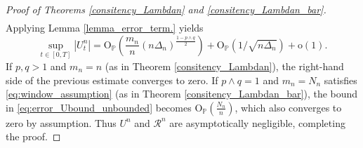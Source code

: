\documentclass[10pt,a4paper]{amsart}
\begin{document}
\begin{proof}[Proof of Theorems  \ref{consitency_Lambdan} and \ref{consitency_Lambdan_bar}]
\begin{equation}
\begin{aligned}
				\end{aligned}
				\label{eq:error_Ubound_unbounded}
			\end{equation}
			Applying Lemma \ref{lemma_error_term.} yields
			\[
			\sup_{t\in[0,T]}|U_t^n|
			=\mathrm{O}_{\mathbb{P}}(\frac{m_{n}}{n}(n\Delta_{n})^{\frac{1-p\land q}{2}})+\mathrm{O}_{\mathbb{P}}(1/\sqrt{n\Delta_{n}})+\mathrm{o}(1).
			\]
			If $p,q>1$ and $m_{n}=n$ (as in Theorem
			\ref{consitency_Lambdan}), the right-hand side of the previous estimate converges to zero. If $p\land q=1$
			and $m_{n}=N_{n}$ satisfies \eqref{eq:window_assumption} (as in Theorem \ref{consitency_Lambdan_bar}), the bound in \eqref{eq:error_Ubound_unbounded} becomes $\mathrm{O}_{\mathbb{P}}(\frac{N_{n}}{n})$, which also converges to zero by assumption. Thus $U^n$ and $\mathcal R^n$ are asymptotically negligible, completing the proof.\end{proof}
\end{document}
